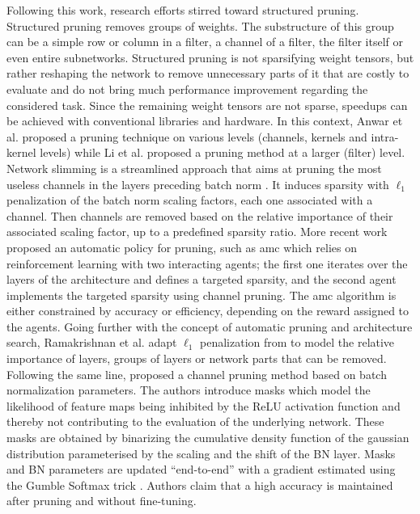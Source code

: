 Following this work, research efforts stirred toward structured pruning.
Structured pruning removes groups of weights. The substructure of this group can
be a simple row or column in a filter, a channel of a filter, the filter itself
or even entire subnetworks. Structured pruning is not sparsifying weight
tensors, but rather reshaping the network to remove unnecessary parts of it that
are costly to evaluate and do not bring much performance improvement regarding
the considered task. Since the remaining weight tensors are not sparse, speedups
can be achieved with conventional libraries and hardware. In this context, Anwar
et al. \cite{anwar2017structured} proposed a pruning technique on various levels
(channels, kernels and intra-kernel levels) while Li et al.
\cite{DBLP:conf/iclr/0022KDSG17} proposed a pruning method at a larger (filter)
level. Network slimming \cite{DBLP:conf/iccv/LiuLSHYZ17} is a streamlined
approach that aims at pruning the most useless channels in the layers preceding
\ac{batch norm} \cite{DBLP:conf/icml/IoffeS15}. It induces sparsity with
$\ell_1$ penalization of the \ac{batch norm} scaling factors, each one
associated with a channel. Then channels are removed based on the relative
importance of their associated scaling factor, up to a predefined sparsity
ratio. More recent work proposed an automatic policy for pruning, such as
\ac{amc} \cite{DBLP:conf/eccv/HeLLWLH18} which relies on reinforcement learning
with two interacting agents; the first one iterates over the layers of the
architecture and defines a targeted sparsity, and the second agent implements
the targeted sparsity using channel pruning. The \ac{amc} algorithm is either
constrained by accuracy or efficiency, depending on the reward assigned to the
agents.  Going further with the concept of automatic pruning and architecture
search, Ramakrishnan et al. \cite{DBLP:conf/crv/RamakrishnanSN20} adapt $\ell_1$
penalization from \cite{DBLP:conf/iccv/LiuLSHYZ17} to model the relative
importance of layers, groups of layers or network parts that can be removed.
Following the same line, \cite{DBLP:conf/icml/KangH20} proposed a channel
pruning method based on batch normalization parameters. The authors introduce
masks which model the likelihood of feature maps being inhibited by the ReLU
activation function and thereby not contributing to the evaluation of the
underlying network. These masks are obtained by binarizing the cumulative
density function of the gaussian distribution parameterised by the scaling and
the shift of the BN layer. Masks and BN parameters are updated “end-to-end” with
a gradient estimated using the Gumble Softmax trick
\cite{DBLP:conf/iclr/JangGP17}. Authors claim that a high accuracy is maintained
after pruning and without fine-tuning. \\




